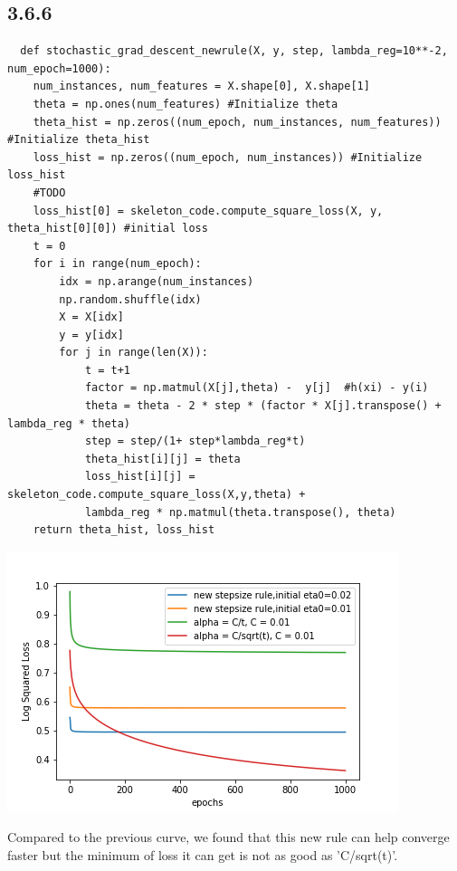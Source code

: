 \documentclass{article}
\begin{document}
\subsection{3.6.6}
\begin{verbatim}
  def stochastic_grad_descent_newrule(X, y, step, lambda_reg=10**-2, num_epoch=1000):
    num_instances, num_features = X.shape[0], X.shape[1]
    theta = np.ones(num_features) #Initialize theta
    theta_hist = np.zeros((num_epoch, num_instances, num_features)) #Initialize theta_hist
    loss_hist = np.zeros((num_epoch, num_instances)) #Initialize loss_hist
    #TODO  
    loss_hist[0] = skeleton_code.compute_square_loss(X, y, theta_hist[0][0]) #initial loss
    t = 0  
    for i in range(num_epoch):
        idx = np.arange(num_instances)
        np.random.shuffle(idx)
        X = X[idx]
        y = y[idx]
        for j in range(len(X)):
            t = t+1
            factor = np.matmul(X[j],theta) -  y[j]  #h(xi) - y(i)
            theta = theta - 2 * step * (factor * X[j].transpose() + lambda_reg * theta)
            step = step/(1+ step*lambda_reg*t)
            theta_hist[i][j] = theta   
            loss_hist[i][j] = skeleton_code.compute_square_loss(X,y,theta) + 
            lambda_reg * np.matmul(theta.transpose(), theta)
    return theta_hist, loss_hist               
\end{verbatim}
\begin{center}
\includegraphics[scale=0.6]{366.png}
\end{center}
Compared to the previous curve, we found that this new rule can help converge faster but the minimum of loss it can get is not as good as 'C/sqrt(t)'.
\end{document}
